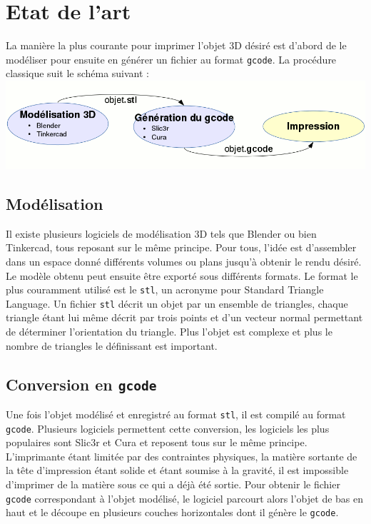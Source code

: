 \documentclass[11pt, titlepage]{article}
\begin{document}
\newpage
\section{Etat de l'art}
La manière la plus courante pour imprimer l'objet 3D désiré est d'abord de le modéliser pour ensuite en générer un fichier au format \verb&gcode&.
La procédure classique suit le schéma suivant :
\includegraphics[scale=1]{img/EtatDeLart.gif}
\subsection{Modélisation}
Il existe plusieurs logiciels de modélisation 3D tels que Blender ou bien Tinkercad, tous reposant sur le même principe. Pour tous, l'idée est d'assembler dans un espace donné différents volumes ou plans jusqu'à obtenir le rendu désiré. Le modèle obtenu peut ensuite être exporté sous différents formats. Le format le plus couramment utilisé est le \verb&stl&, un acronyme pour Standard Triangle Language. Un fichier \verb&stl& décrit un objet par un ensemble de triangles, chaque triangle étant lui même décrit par trois points et d'un vecteur normal permettant de déterminer l'orientation du triangle. Plus l'objet est complexe et plus le nombre de triangles le définissant est important.

\subsection{Conversion en \verb&gcode&}
Une fois l'objet modélisé et enregistré au format \verb&stl&, il est compilé au format \verb&gcode&.
Plusieurs logiciels permettent cette conversion, les logiciels les plus populaires sont Slic3r et Cura et reposent tous sur le même principe.
L'imprimante étant limitée par des contraintes physiques, la matière sortante de la tête d'impression étant solide et étant soumise à la gravité, il est impossible d'imprimer de la matière sous ce qui a déjà été sortie.
Pour obtenir le fichier \verb&gcode& correspondant à l'objet modélisé, le logiciel parcourt alors l'objet de bas en haut et le découpe en plusieurs couches horizontales dont il génère le \verb&gcode&.
\end{document}
